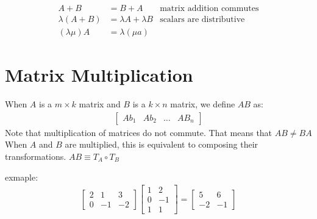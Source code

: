 \documentclass{article}
\theoremstyle{mytheoremstyle}
\theoremstyle{mytheoremstyle}
\theoremstyle{myproblemstyle}
\begin{document}
    \begin{align*}
        A+B             &= B+A & \text{matrix addition commutes}\\
        \lambda (A+B)   &= \lambda A + \lambda B & \text{scalars are distributive}\\
        (\lambda\mu)A   &= \lambda(\mu a)
    \end{align*}

    \section*{Matrix Multiplication}
    When $A$ is a $m\times k$ matrix and $B$ is a $k\times n$ matrix, we define
    $AB$ as:
    \begin{align*}
        \begin{bmatrix}
            Ab_1 & Ab_2 & \dots & AB_n
        \end{bmatrix}
    \end{align*}
    Note that multiplication of matrices do not commute. That means that $AB\ne
    BA$ When $A$ and $B$ are multiplied, this is equivalent to composing their
    transformations. $AB \equiv T_A \circ T_B$

    exmaple:
    \begin{align*}
        \begin{bmatrix}
            2 & 1 & 3 \\
            0 & -1 & -2
        \end{bmatrix} \begin{bmatrix}
            1 & 2 \\
            0 & -1 \\
            1 & 1
        \end{bmatrix} = \begin{bmatrix}
            5 & 6 \\
            -2 & -1
        \end{bmatrix}
    \end{align*}
\end{document}
